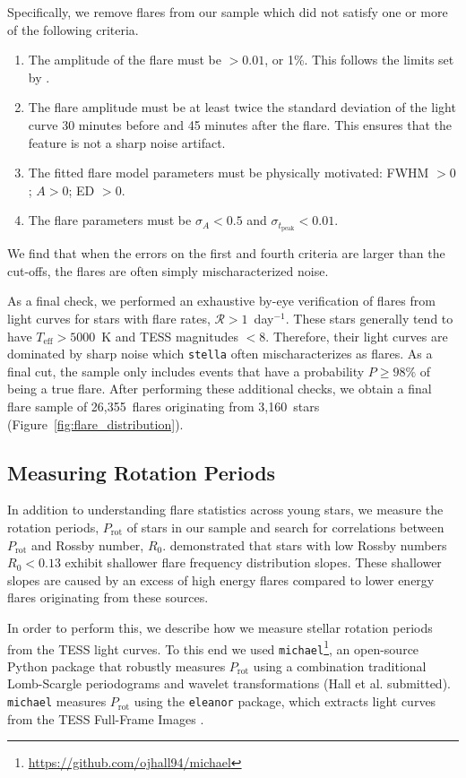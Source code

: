 \documentclass[twocolumn]{aastex631}
\newcommand{\nflares}{26,355}
\newcommand{\nflarestars}{3,160}
\begin{document}
Specifically, we remove flares from our sample which did not satisfy  one or more of the following criteria.
\begin{enumerate}
    \item  The amplitude of the flare must be $> 0.01$, or 1\%. This follows the limits set by \cite{feinstein20}.
    \item The flare amplitude  must be at least twice the standard deviation of the light curve 30 minutes before and 45 minutes after the flare. This ensures that the feature is not a sharp noise artifact.
    \item  The fitted flare model parameters must be physically motivated: FWHM $> 0$; $A > 0$; ED $> 0$.
    \item The flare parameters must be $\sigma_A < 0.5$ and $\sigma_{t_\textrm{peak}} < 0.01$.
\end{enumerate}
We find that when the errors on the first and fourth criteria are larger than the cut-offs, the flares are often simply mischaracterized noise.

As a final check, we performed an exhaustive by-eye verification of flares from light curves for stars with flare rates, $\mathcal{R} > 1$~day$^{-1}$. These stars generally tend to have $T_\textrm{eff} > 5000$~K and TESS magnitudes $< 8$. Therefore, their light curves are dominated by sharp noise which \texttt{stella} often mischaracterizes as flares. As a final cut, the sample only includes events that have  a probability $P \geq 98\%$ of being
a true flare. After performing these additional checks, we obtain a final flare sample of \nflares\ flares originating from \nflarestars\ stars (Figure~\ref{fig:flare_distribution}).

\subsection{Measuring Rotation Periods}\label{subsec:prot}

In addition to understanding flare statistics across young stars, we measure the rotation periods, $P_\textrm{rot}$ of stars in our sample and search for correlations between $P_\textrm{rot}$ and Rossby number, $R_0$. \citet{seligman22} demonstrated that stars with low Rossby numbers $R_0 < 0.13$ exhibit shallower flare frequency distribution slopes. These shallower slopes are caused by  an excess of  high energy flares compared to lower energy flares originating from these sources.

In order to perform this, we describe how we measure stellar rotation periods from the TESS light curves. To this end we used \texttt{michael}\footnote{\url{https://github.com/ojhall94/michael}}, an open-source Python package that robustly measures $P_\textrm{rot}$ using a combination traditional Lomb-Scargle periodograms and wavelet transformations (Hall et al. submitted).
\texttt{michael} measures $P_\textrm{rot}$ using the \texttt{eleanor} package, which extracts light curves from the TESS Full-Frame Images \citep[FFIs;][]{feinstein19}.
\end{document}
